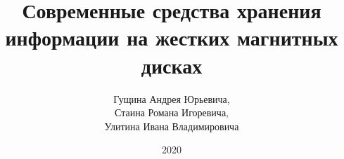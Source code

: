 \documentclass[bachelor, och, referat]{SCWorks}
\begin{document}
\chair{}

\title{Современные средства хранения информации на жестких магнитных дисках}






\author{
    Гущина Андрея Юрьевича, \\
    Стаина Романа Игоревича, \\
    Улитина Ивана Владимировича 
}








\date{2020}

\maketitle
\end{document}
